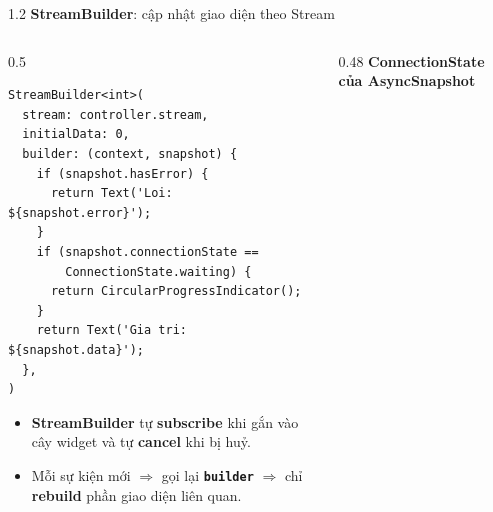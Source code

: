 \documentclass[aspectratio=169,10pt]{beamer}
\newcommand{\api}[1]{\texttt{\bfseries #1}}   %
\begin{document}
\begin{frame}[fragile]{1.2 \textbf{StreamBuilder}: cập nhật giao diện theo Stream}
  \begin{columns}[T]
    \begin{column}{0.5\textwidth}
\begin{lstlisting}
StreamBuilder<int>(
  stream: controller.stream,
  initialData: 0,
  builder: (context, snapshot) {
    if (snapshot.hasError) {
      return Text('Loi: ${snapshot.error}');
    }
    if (snapshot.connectionState ==
        ConnectionState.waiting) {
      return CircularProgressIndicator();
    }
    return Text('Gia tri: ${snapshot.data}');
  },
)
\end{lstlisting}
      \small
      \begin{itemize}\itemsep2pt
        \item \textbf{StreamBuilder} tự \textbf{subscribe} khi gắn vào cây widget và tự \textbf{cancel} khi bị huỷ.
        \item Mỗi sự kiện mới $\Rightarrow$ gọi lại \api{builder} $\Rightarrow$ chỉ \textbf{rebuild} phần giao diện liên quan.
      \end{itemize}
    \end{column}
    \begin{column}{0.48\textwidth}
      \centering
      \textbf{\footnotesize ConnectionState của AsyncSnapshot}\\[6pt]
    \end{column}
  \end{columns}
\end{frame}
\end{document}
